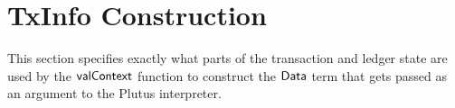 \section{TxInfo Construction}
\label{sec:txinfo}

This section specifies exactly what parts of the transaction and ledger
state are used by the $\mathsf{valContext}$ function to construct the
$\mathsf{Data}$ term that gets passed as an
argument to the Plutus interpreter.
